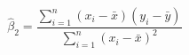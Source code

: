 

\[
\hat{\beta}_2 = \frac{\sum_{i=1}^{n} (x_i-\bar{x})(y_i-\bar{y})}{\sum_{i=1}^{n} (x_i-\bar{x})^2}
\]


